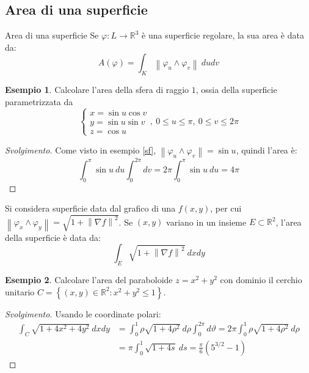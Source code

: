 \documentclass[11pt, a4paper]{scrartcl}
\newenvironment{svolgimento}{\renewcommand\qedsymbol{$\blacksquare$}\begin{proof}[Svolgimento]}{\end{proof}}
\theoremstyle{definition}
\newtheorem{esempio}{Esempio}
\numberwithin{esempio}{section}
\theoremstyle{definition}
\numberwithin{obs}{section}
\numberwithin{nota}{section}
\numberwithin{equation}{subsection}
\begin{document}
\subsection{Area di una superficie}
\begin{definizione}
	{Area di una superficie}{}
	Se $\varphi : L \to \mathbb{R}^3$ \`e una superficie regolare, la sua area \`e data da:
	\[
	A(\varphi ) = \int_{K}  \left\lVert \varphi _u \wedge \varphi _v \right\rVert \ du dv
	\] 
	
\end{definizione}
\begin{esempio}
Calcolare l'area della sfera di raggio $1$, ossia della superficie parametrizzata da
\[
\begin{cases}
	x = \sin u  \cos v\\
	y = \sin u \sin v \\
	z = \cos u
\end{cases}, \ 0\le u\le \pi,\ 0\le  v \le 2\pi
\] 
\begin{svolgimento}
	Come visto in esempio \ref{sf}, $\left\lVert \varphi _u \wedge \varphi _v \right\rVert = \sin u$, quindi l'area \`e:
	\[
	\int_{0} ^\pi \sin u\ du \int_{0} ^{2\pi} dv = 2\pi \int_{0} ^\pi \sin u \ du = 4\pi
	\] 
\end{svolgimento}
\end{esempio}
	Si considera superficie data dal grafico di una $f(x,y)$, per cui $\left\lVert \varphi _x \wedge \varphi _y \right\rVert  = \sqrt{1+\left\lVert \nabla f \right\rVert ^2} $.
	Se $(x,y)$ variano in un insieme $E \subset \mathbb{R}^2$, l'area della superficie \`e data da:
	\begin{equation}
		\int_{E} \sqrt{1 + \left\lVert \nabla f \right\rVert ^2 } \ dxdy
	\end{equation}
\begin{esempio}
Calcolare l'area del paraboloide $z = x^2 + y^2$ con dominio il cerchio unitario $C = \left\{ (x,y) \in \mathbb{R}^2 : x^2 + y^2 \le 1 \right\} $.
\begin{svolgimento}
	Usando le coordinate polari:
	\[
	\begin{split}
		\int_{C} \sqrt{1+4x^2 + 4y^2}  \ dx dy & = \int_{0} ^1 \rho \sqrt{1+ 4 \rho ^2 }  \ d\rho \int_{0} ^{2\pi } d\vartheta = 2\pi \int_{0} ^1 \rho  \sqrt{1 + 4 \rho ^2 }  \ d\rho \\
						       &= \pi \int_{0} ^1 \sqrt{1 + 4s }  \ ds = \frac{\pi}{6} \left(5 ^{3 / 2} - 1\right) 
	\end{split}
	\] 
	
\end{svolgimento}
\end{esempio}	
\end{document}
